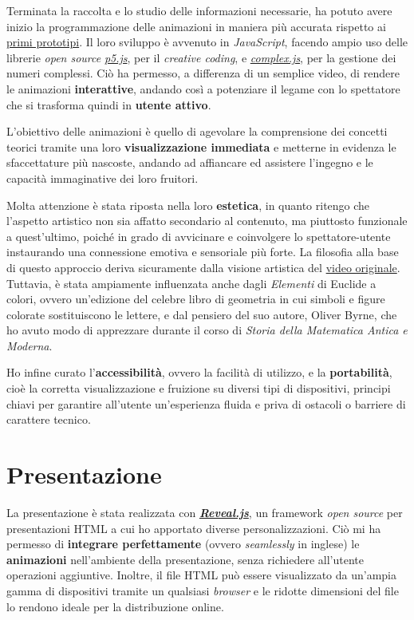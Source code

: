 \documentclass[
]{book}
\begin{document}
Terminata la raccolta e lo studio delle informazioni necessarie, ha potuto avere inizio la programmazione delle animazioni in maniera più accurata rispetto ai \protect\hyperlink{prototipi}{primi prototipi}.
Il loro sviluppo è avvenuto in \emph{JavaScript}, facendo ampio uso delle librerie \emph{open source} \href{https://p5js.org/}{\emph{p5.js}}, per il \emph{creative coding}, e \href{https://github.com/infusion/Complex.js/}{\emph{complex.js}}, per la gestione dei numeri complessi. Ciò ha permesso, a differenza di un semplice video, di rendere le animazioni \textbf{interattive}, andando così a potenziare il legame con lo spettatore che si trasforma quindi in \textbf{utente attivo}.

L'obiettivo delle animazioni è quello di agevolare la comprensione dei concetti teorici tramite una loro \textbf{visualizzazione immediata} e metterne in evidenza le sfaccettature più nascoste, andando ad affiancare ed assistere l'ingegno e le capacità immaginative dei loro fruitori.

Molta attenzione è stata riposta nella loro \textbf{estetica}, in quanto ritengo che l'aspetto artistico non sia affatto secondario al contenuto, ma piuttosto funzionale a quest'ultimo, poiché in grado di avvicinare e coinvolgere lo spettatore-utente instaurando una connessione emotiva e sensoriale più forte.
La filosofia alla base di questo approccio deriva sicuramente dalla visione artistica del \href{https://www.youtube.com/watch?v=r6sGWTCMz2k}{video originale}. Tuttavia, è stata ampiamente influenzata anche dagli \emph{Elementi} di Euclide a colori, ovvero un'edizione del celebre libro di geometria in cui simboli e figure colorate sostituiscono le lettere, e dal pensiero del suo autore, Oliver Byrne, che ho avuto modo di apprezzare durante il corso di \emph{Storia della Matematica Antica e Moderna}.

Ho infine curato l'\textbf{accessibilità}, ovvero la facilità di utilizzo, e la \textbf{portabilità}, cioè la corretta visualizzazione e fruizione su diversi tipi di dispositivi, principi chiavi per garantire all'utente un'esperienza fluida e priva di ostacoli o barriere di carattere tecnico.

\hypertarget{presentazione}{%
\section{Presentazione}\label{presentazione}}

La presentazione è stata realizzata con \href{https://revealjs.com/}{\emph{\textbf{Reveal.js}}}, un framework \emph{open source} per presentazioni HTML a cui ho apportato diverse personalizzazioni.
Ciò mi ha permesso di \textbf{integrare perfettamente} (ovvero \emph{seamlessly} in inglese) le \textbf{animazioni} nell'ambiente della presentazione, senza richiedere all'utente operazioni aggiuntive. Inoltre, il file HTML può essere visualizzato da un'ampia gamma di dispositivi tramite un qualsiasi \emph{browser} e le ridotte dimensioni del file lo rendono ideale per la distribuzione online.
\end{document}
